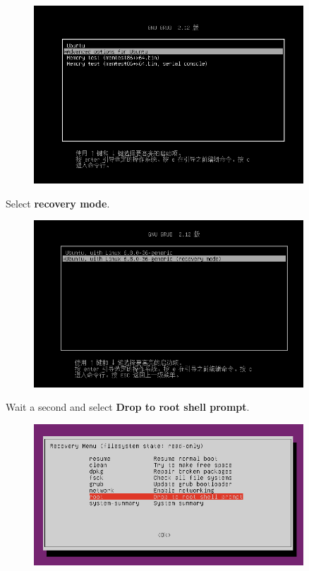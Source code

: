 \documentclass[12pt]{ctexart}
\begin{document}
\begin{figure}[H]
    \centering
    \includegraphics[width=0.9\textwidth,keepaspectratio]{assets/Linux/2.1 SHIT, I forgot my password again!/3.png}
\end{figure}

Select \textbf{recovery mode}.

\begin{figure}[H]
    \centering
    \includegraphics[width=0.9\textwidth,keepaspectratio]{assets/Linux/2.1 SHIT, I forgot my password again!/4.png}
\end{figure}

Wait a second and select \textbf{Drop to root shell prompt}.

\begin{figure}[H]
    \centering
    \includegraphics[width=0.9\textwidth,keepaspectratio]{assets/Linux/2.1 SHIT, I forgot my password again!/5.png}
\end{figure}
\end{document}
